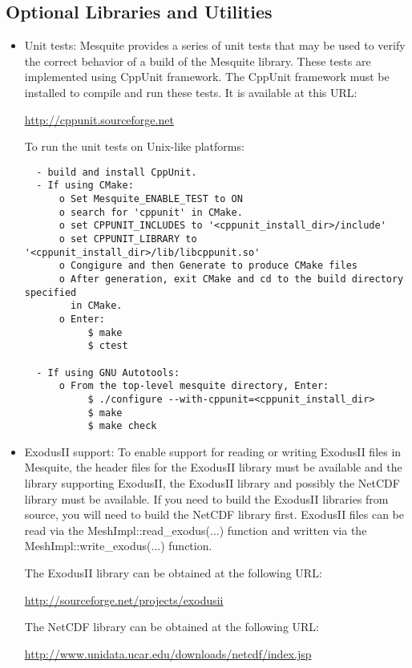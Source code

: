 \subsection{Optional Libraries and Utilities}
\label{sec:depends}
\begin{itemize}
\item Unit tests:  Mesquite provides a series of unit tests that may be used
to verify the correct behavior of a build of the Mesquite library.  These tests
are implemented using CppUnit framework.  The CppUnit framework must be installed
to compile and run these tests.  It is available at this URL:
\begin{center}
\url{http://cppunit.sourceforge.net}
\end{center}

To run the unit tests on Unix-like platforms:
\begin{verbatim}
  - build and install CppUnit.
  - If using CMake:
      o Set Mesquite_ENABLE_TEST to ON
      o search for 'cppunit' in CMake.
      o set CPPUNIT_INCLUDES to '<cppunit_install_dir>/include'  
      o set CPPUNIT_LIBRARY to '<cppunit_install_dir>/lib/libcppunit.so' 
      o Congigure and then Generate to produce CMake files
      o After generation, exit CMake and cd to the build directory specified
        in CMake.  
      o Enter:
           $ make
           $ ctest

  - If using GNU Autotools:
      o From the top-level mesquite directory, Enter:
           $ ./configure --with-cppunit=<cppunit_install_dir>
           $ make
           $ make check

\end{verbatim}
\item ExodusII support:  To enable support for reading or writing ExodusII files in Mesquite, the header files for the ExodusII library must be available and the library supporting ExodusII, the ExodusII library and possibly the NetCDF library must be available. If you need to build the ExodusII libraries from source, you will need to build the NetCDF library first.  ExodusII files can be read via the MeshImpl::read\_exodus(...) function and written via the MeshImpl::write\_exodus(...) function. 

 The ExodusII library can be obtained at the following URL:
\begin{center}
\begin{small}\url{http://sourceforge.net/projects/exodusii}\end{small}
\end{center}

The NetCDF library can be obtained at the following URL:
\begin{center}
\begin{small}\url{http://www.unidata.ucar.edu/downloads/netcdf/index.jsp}\end{small}
\end{center}


\end{itemize}

